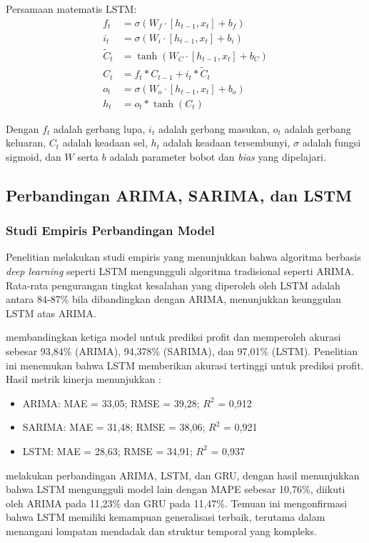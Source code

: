Persamaan matematis LSTM:
\begin{align}
f_t &= \sigma(W_f \cdot [h_{t-1}, x_t] + b_f) \\
i_t &= \sigma(W_i \cdot [h_{t-1}, x_t] + b_i) \\
\tilde{C}_t &= \tanh(W_C \cdot [h_{t-1}, x_t] + b_C) \\
C_t &= f_t * C_{t-1} + i_t * \tilde{C}_t \\
o_t &= \sigma(W_o \cdot [h_{t-1}, x_t] + b_o) \\
h_t &= o_t * \tanh(C_t)
\end{align}

Dengan $f_t$ adalah gerbang lupa, $i_t$ adalah gerbang masukan, $o_t$ adalah gerbang keluaran, $C_t$ adalah keadaan sel, $h_t$ adalah keadaan tersembunyi, $\sigma$ adalah fungsi sigmoid, dan $W$ serta $b$ adalah parameter bobot dan \textit{bias} yang dipelajari.

\subsection{Perbandingan ARIMA, SARIMA, dan LSTM}

\subsubsection{Studi Empiris Perbandingan Model}

Penelitian \textcite{siami2018comparison} melakukan studi empiris yang menunjukkan bahwa algoritma berbasis \textit{deep learning} seperti LSTM mengungguli algoritma tradisional seperti ARIMA. Rata-rata pengurangan tingkat kesalahan yang diperoleh oleh LSTM adalah antara 84-87\% bila dibandingkan dengan ARIMA, menunjukkan keunggulan LSTM atas ARIMA.

\textcite{sirisha2022profit} membandingkan ketiga model untuk prediksi profit dan memperoleh akurasi sebesar 93,84\% (ARIMA), 94,378\% (SARIMA), dan 97,01\% (LSTM). Penelitian ini menemukan bahwa LSTM memberikan akurasi tertinggi untuk prediksi profit. Hasil metrik kinerja menunjukkan \parencite{sirisha2022profit}:
\begin{itemize}
\item ARIMA: MAE = 33,05; RMSE = 39,28; $R^2$ = 0,912
\item SARIMA: MAE = 31,48; RMSE = 38,06; $R^2$ = 0,921
\item LSTM: MAE = 28,63; RMSE = 34,91; $R^2$ = 0,937
\end{itemize}

\textcite{sunendar2025comparison} melakukan perbandingan ARIMA, LSTM, dan GRU, dengan hasil menunjukkan bahwa LSTM mengungguli model lain dengan MAPE sebesar 10,76\%, diikuti oleh ARIMA pada 11,23\% dan GRU pada 11,47\%. Temuan ini mengonfirmasi bahwa LSTM memiliki kemampuan generalisasi terbaik, terutama dalam menangani lompatan mendadak dan struktur temporal yang kompleks.

